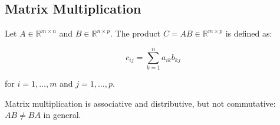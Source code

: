 
\subsection{Matrix Multiplication}

Let \( A \in \mathbb{R}^{m \times n} \) and \( B \in \mathbb{R}^{n \times p} \). The product \( C = AB \in \mathbb{R}^{m \times p} \) is defined as:

\[
c_{ij} = \sum_{k=1}^{n} a_{ik} b_{kj}
\]

for \( i = 1, \ldots, m \) and \( j = 1, \ldots, p \).

Matrix multiplication is associative and distributive, but not commutative: \( AB \neq BA \) in general.

